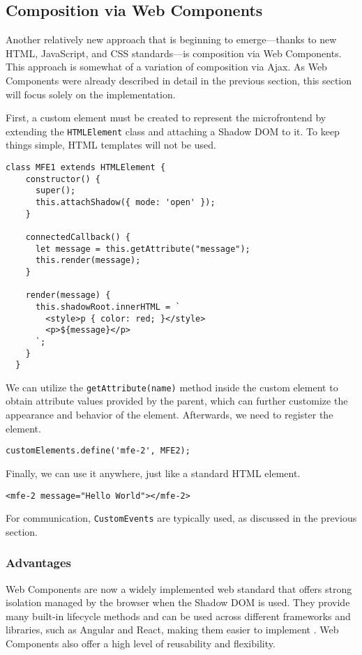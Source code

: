 \subsection{Composition via Web Components}
Another relatively new approach that is beginning to emerge—thanks to new HTML, JavaScript, and CSS standards—is composition via Web Components. This approach is somewhat of a variation of composition via Ajax. As Web Components were already described in detail in the previous section, this section will focus solely on the implementation.

First, a custom element must be created to represent the microfrontend by extending the \texttt{HTMLElement} class and attaching a Shadow DOM to it. To keep things simple, HTML templates will not be used.
\begin{lstlisting}[caption={Example of Web Component composition}]
  class MFE1 extends HTMLElement {
    constructor() {
      super();
      this.attachShadow({ mode: 'open' });
    }
    
    connectedCallback() {
      let message = this.getAttribute("message");
      this.render(message);
    }
    
    render(message) {
      this.shadowRoot.innerHTML = `
        <style>p { color: red; }</style>
        <p>${message}</p>
      `;
    }
  }
\end{lstlisting}
We can utilize the \texttt{getAttribute(name)} method inside the custom element to obtain attribute values provided by the parent, which can further customize the appearance and behavior of the element. Afterwards, we need to register the element.
\begin{lstlisting}[caption={Example of Web Component registration}]
customElements.define('mfe-2', MFE2);
\end{lstlisting}
Finally, we can use it anywhere, just like a standard HTML element.
\begin{lstlisting}[caption={Example of Web Component usage}]
<mfe-2 message="Hello World"></mfe-2>
\end{lstlisting}
For communication, \texttt{CustomEvents} are typically used, as discussed in the previous section.

\subsubsection{Advantages}
Web Components are now a widely implemented web standard that offers strong isolation managed by the browser when the Shadow DOM is used. They provide many built-in lifecycle methods and can be used across different frameworks and libraries, such as Angular and React, making them easier to implement \cite{Geers}. Web Components also offer a high level of reusability and flexibility.

